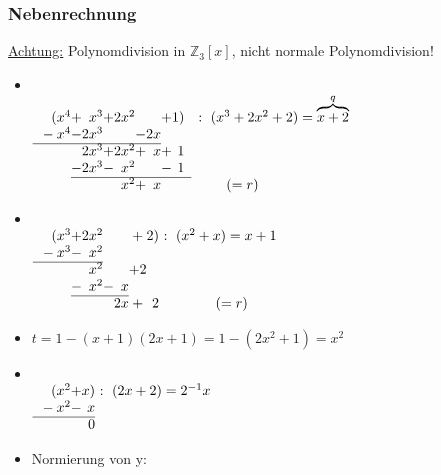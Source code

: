 \documentclass[a4paper, 12pt,titlepage, pdf, headsepline]{article}
\newcommand{\uline}[1]{\underline{#1}}
\renewcommand{\>}{\rightarrow}
\renewcommand{\*}{\cdot}
\begin{document}
		      	\subsubsection*{Nebenrechnung} \uline{Achtung:} Polynomdivision in $\mathds{Z}_3[x]$, nicht normale Polynomdivision!\\
		      	\begin{itemize}
		      		\item ~\\
		      		      $\begin{array}{r@{}c@{}r@{}c@{}r@{}c@{}r@{}c@{}rl}
		      		      	(x^4 & + & x^3 & + & 2x^2 &   &   & + & 1) & :  ~ (x^3+2x^2+2) = \overbrace{x+2}^{q} \\
		      		      	{}-x^4 &- & 2x^3 &  & &-&2x \\ \cline{1-7} 
		      		      	&  & 2x^3 & + & 2x^2 & + & x&+&1 \\
		      		      	&- &2x^3 & - & x^2 &  & &-&1 \\ \cline{2-9}
		      		      	     &   &     &   & x^2  & + & x &   &    & \qquad (=r)                             
		      		      \end{array}$
		      		\item ~\\
		      		      $\begin{array}{r@{}c@{}r@{}c@{}r@{}c@{}r@{}c@{}rl}
		      		      	(x^3 & + & 2x^2 &   &    & + & 2) & ~ :  ~ (x^2+x) =x+1 \\
		      		      	{}-x^3&-&x^2\\ \cline{1-3}
		      		      	&&x^2&&&+2\\
		      		      	&-&x^2&-&x\\\cline{2-5}
		      		      	     &   &      &   & 2x & + & 2  & \qquad (=r)         
		      		      \end{array}$
		      		\item $ t = 1-(x+1)(2x+1) = 1-(2x^2 + 1) = x^2$ \\
		      		\item ~\\
		      		      $\begin{array}{r@{}c@{}r@{}c@{}r@{}c@{}r@{}c@{}rl}
		      		      	(x^2 & + & x) & ~ :  ~ (2x+2) =2^{-1}x \\
		      		      	{}-x^2&-&x\\ \cline{1-3}
		      		      	&&0
		      		      \end{array}$
		      		\item Normierung von y: \\

\end{itemize}
\end{document}
